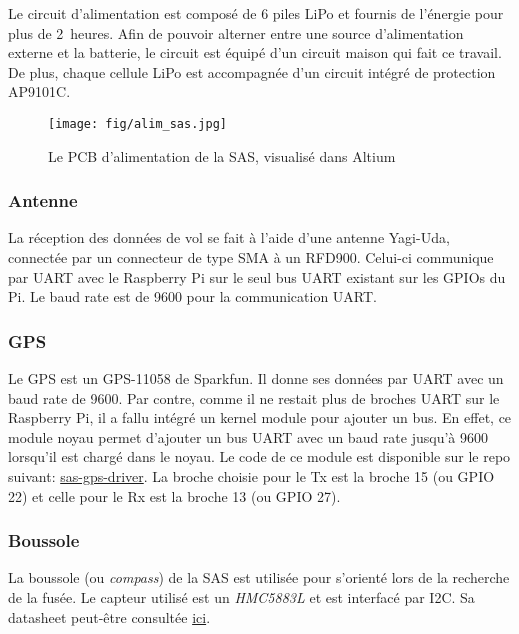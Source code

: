 Le circuit d'alimentation est composé de 6 piles LiPo et fournis de l'énergie
pour plus de 2~heures. Afin de pouvoir alterner entre une source d'alimentation
externe et la batterie, le circuit est équipé d'un circuit maison qui fait ce
travail. De plus, chaque cellule LiPo est accompagnée d'un circuit intégré de
protection AP9101C.

\begin{figure}[H]
	\center
	\texttt{[image: fig/alim\_sas.jpg]}
	\caption{Le PCB d'alimentation de la SAS, visualisé dans Altium}
	\label{f:alim_sas}
\end{figure}

\subsubsection{Antenne}

La réception des données de vol se fait à l'aide d'une antenne Yagi-Uda,
connectée par un connecteur de type SMA à un RFD900. Celui-ci communique par
UART avec le Raspberry Pi sur le seul bus UART existant sur les GPIOs du Pi. Le
baud rate est de 9600 pour la communication UART.

\subsubsection{GPS}

Le GPS est un GPS-11058 de Sparkfun. Il donne ses données par UART avec un baud
rate de 9600. Par contre, comme il ne restait plus de broches UART sur le
Raspberry Pi, il a fallu intégré un kernel module pour ajouter un bus. En
effet, ce module noyau permet d'ajouter un bus UART avec un baud rate jusqu'à
9600 lorsqu'il est chargé dans le noyau. Le code de ce module est disponible
sur le repo suivant:
\href{https://github.com/ul-gaul/sas-driver-gps}{sas-gps-driver}. La broche
choisie pour le Tx est la broche 15 (ou GPIO 22) et celle pour le Rx est la
broche 13 (ou GPIO 27).

\subsubsection{Boussole}

La boussole (ou \textit{compass}) de la SAS est utilisée pour s'orienté lors de
la recherche de la fusée. Le capteur utilisé est un \textit{HMC5883L} et est
interfacé par I2C. Sa datasheet peut-être consultée
\href{https://cdn-shop.adafruit.com/datasheets/HMC5883L_3-Axis_Digital_Compass_IC.pdf}{ici}.


